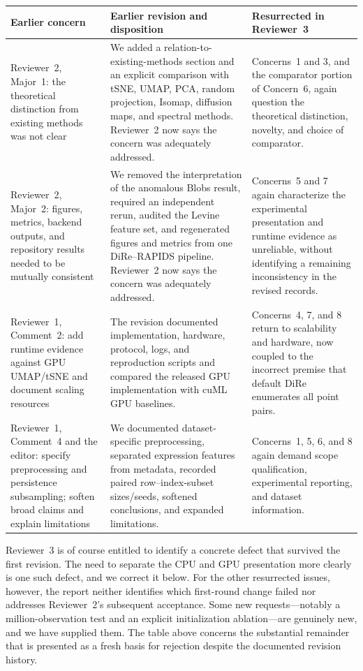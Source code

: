 \documentclass[11pt]{article}
\begin{document}
\begin{center}
\small
\begin{tabularx}{\textwidth}{@{}p{}X
  p{}@{}}
\toprule
Earlier concern & Earlier revision and disposition & Resurrected in
Reviewer~3 \\
\midrule
Reviewer~2, Major~1: the theoretical distinction from existing methods was not
clear &
We added a relation-to-existing-methods section and an explicit comparison
with tSNE, UMAP, PCA, random projection, Isomap, diffusion maps, and spectral
methods. Reviewer~2 now says the concern was adequately addressed. &
Concerns~1 and 3, and the comparator portion of Concern~6, again question the
theoretical distinction, novelty, and choice of comparator. \\
\addlinespace
Reviewer~2, Major~2: figures, metrics, backend outputs, and repository results
needed to be mutually consistent &
We removed the interpretation of the anomalous Blobs result, required an
independent rerun, audited the Levine feature set, and regenerated figures and
metrics from one DiRe--RAPIDS pipeline. Reviewer~2 now says the concern was
adequately addressed. &
Concerns~5 and 7 again characterize the experimental presentation and runtime
evidence as unreliable, without identifying a remaining inconsistency in the
revised records. \\
\addlinespace
Reviewer~1, Comment~2: add runtime evidence against GPU UMAP/tSNE and document
scaling resources &
The revision documented implementation, hardware, protocol, logs, and
reproduction scripts and compared the released GPU implementation with cuML
GPU baselines. &
Concerns~4, 7, and 8 return to scalability and hardware, now coupled to the
incorrect premise that default DiRe enumerates all point pairs. \\
\addlinespace
Reviewer~1, Comment~4 and the editor: specify preprocessing and persistence
subsampling; soften broad claims and explain limitations &
We documented dataset-specific preprocessing, separated expression features
from metadata, recorded paired row--index-subset sizes/seeds, softened conclusions,
and expanded limitations. &
Concerns~1, 5, 6, and 8 again demand scope qualification, experimental
reporting, and dataset information. \\
\bottomrule
\end{tabularx}
\end{center}

Reviewer~3 is of course entitled to identify a concrete defect that survived
the first revision. The need to separate the CPU and GPU presentation more
clearly is one such defect, and we correct it below. For the other resurrected
issues, however, the report neither identifies which first-round change failed
nor addresses Reviewer~2's subsequent acceptance. Some new requests---notably a
million-observation test and an explicit initialization ablation---are
genuinely new, and we have supplied them. The table above concerns the
substantial remainder that is presented as a fresh basis for rejection despite
the documented revision history.
\end{document}
